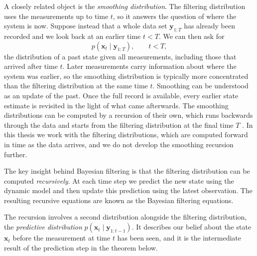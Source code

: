 A closely related object is the \emph{smoothing distribution}. The filtering distribution uses the measurements up to time $t$, so it answers the question of where the system is now. Suppose instead that a whole data set $\mathbf{y}_{1:T}$ has already been recorded and we look back at an earlier time $t < T$. We can then ask for
\[
p(\mathbf{x}_t \mid \mathbf{y}_{1:T}), \qquad t < T,
\]
the distribution of a past state given all measurements, including those that arrived after time $t$. Later measurements carry information about where the system was earlier, so the smoothing distribution is typically more concentrated than the filtering distribution at the same time $t$. Smoothing can be understood as an update of the past. Once the full record is available, every earlier state estimate is revisited in the light of what came afterwards. The smoothing distributions can be computed by a recursion of their own, which runs backwards through the data and starts from the filtering distribution at the final time $T$ \cite[Ch.~8]{sarkka:bayesian_filtering}. In this thesis we work with the filtering distributions, which are computed forward in time as the data arrives, and we do not develop the smoothing recursion further.

The key insight behind Bayesian filtering is that the filtering distribution can be computed \textit{recursively}. At each time step we predict the new state using the dynamic model and then update this prediction using the latest observation. The resulting recursive equations are known as the Bayesian filtering equations. 

The recursion involves a second distribution alongside the filtering distribution, the \emph{predictive distribution} $p(\mathbf{x}_t \mid \mathbf{y}_{1:t-1})$. It describes our belief about the state $\mathbf{x}_t$ before the measurement at time $t$ has been seen, and it is the intermediate result of the prediction step in the theorem below.


